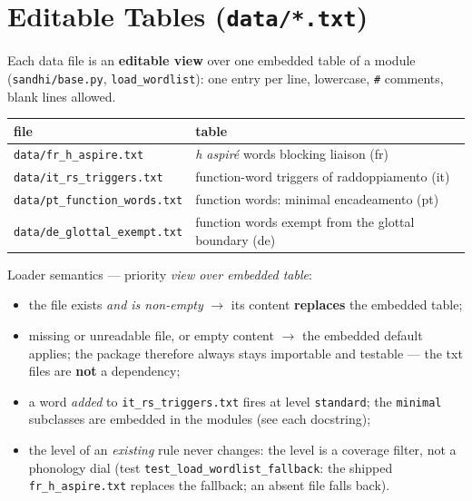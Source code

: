 \documentclass[11pt,a4paper]{report}
\newcommand{\smp}[1]{\texttt{#1}}          %
\begin{document}
\chapter{Editable Tables (\texttt{data/*.txt})}

Each data file is an \textbf{editable view} over one embedded table of a
module (\smp{sandhi/base.py}, \smp{load\_wordlist}): one entry per line,
lowercase, \smp{\#} comments, blank lines allowed.

\begin{center}
\begin{tabular}{@{}ll@{}}
\toprule
file & table \\
\midrule
\smp{data/fr\_h\_aspire.txt} & \emph{h aspir\'e} words blocking liaison (fr) \\
\smp{data/it\_rs\_triggers.txt} & function-word triggers of raddoppiamento (it) \\
\smp{data/pt\_function\_words.txt} & function words: minimal encadeamento (pt) \\
\smp{data/de\_glottal\_exempt.txt} & function words exempt from the glottal boundary (de) \\
\bottomrule
\end{tabular}
\end{center}

\noindent Loader semantics — priority \emph{view over embedded table}:

\begin{itemize}
  \item the file exists \emph{and is non-empty} $\rightarrow$ its content
        \textbf{replaces} the embedded table;
  \item missing or unreadable file, or empty content $\rightarrow$ the
        embedded default applies; the package therefore always stays
        importable and testable — the txt files are \textbf{not} a
        dependency;
  \item a word \emph{added} to \smp{it\_rs\_triggers.txt} fires at level
        \smp{standard}; the \smp{minimal} subclasses are embedded in the
        modules (see each docstring);
  \item the level of an \emph{existing} rule never changes: the level is a
        coverage filter, not a phonology dial (test
        \smp{test\_load\_wordlist\_fallback}: the shipped
        \smp{fr\_h\_aspire.txt} replaces the fallback; an absent file falls
        back).
\end{itemize}
\end{document}
